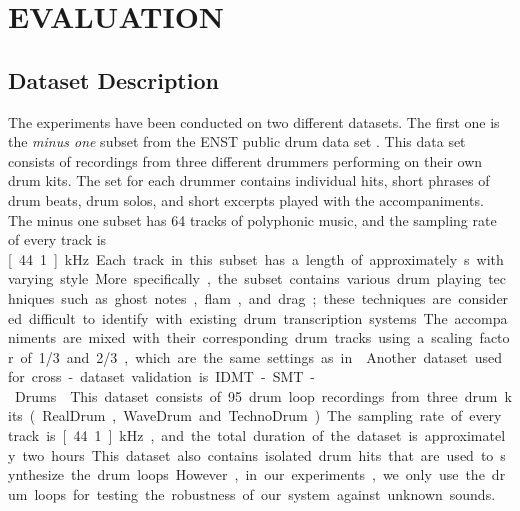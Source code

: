 \documentclass{article}
\begin{document}
\section{EVALUATION}\label{sec:Evaluation}
\subsection{Dataset Description}\label{subsec:data set description}
The experiments have been conducted on two different datasets. The first one is the \textit{minus one} subset from the ENST public drum data set \cite{gillet_enst-drums:_2006}. This data set consists of recordings from three different drummers performing on their own drum kits. The set for each drummer contains individual hits, short phrases of drum beats, drum solos, and short excerpts played with the accompaniments. The minus one subset has 64 tracks of polyphonic music, and the sampling rate of every track is \unit[44.1]{kHz}. Each track in this subset has a length of approximately \unit[70]{s} with varying style. More specifically, the subset contains various drum playing techniques such as ghost notes, flam, and drag; these techniques are considered difficult to identify with existing drum transcription systems. The accompaniments are mixed with their corresponding drum tracks using a scaling factor of 1/3 and 2/3, which are the same settings as in \cite{Paulus2009a}. %
 

Another dataset used for cross-dataset validation is IDMT-SMT-Drums \cite{Dittmar2014}. This dataset consists of 95 drum loop recordings from three drum kits (RealDrum, WaveDrum and TechnoDrum). The sampling rate of every track is \unit[44.1]{kHz}, and the total duration of the dataset is approximately two hours. This dataset also contains isolated drum hits that are used to synthesize the drum loops. However, in our experiments, we only use the drum loops for testing the robustness of our system against unknown sounds.   
\end{document}
